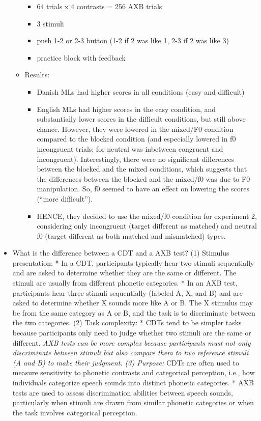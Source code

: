 \documentclass[
]{article}
\providecommand{\tightlist}{%
  \setlength{\itemsep}{0pt}\setlength{\parskip}{0pt}}
\begin{document}
\begin{itemize}
\begin{itemize}
    \begin{itemize}
    \tightlist
    \item
      64 trials x 4 contrasts = 256 AXB trials
    \item
      3 stimuli
    \item
      push 1-2 or 2-3 button (1-2 if 2 was like 1, 2-3 if 2 was like 3)
    \item
      practice block with feedback
    \end{itemize}
  \item
    Results:

    \begin{itemize}
    \tightlist
    \item
      Danish MLs had higher scores in all conditions (easy and
      difficult)
    \item
      English MLs had higher scores in the easy condition, and
      substantially lower scores in the difficult conditions, but still
      above chance. However, they were lowered in the mixed/F0 condition
      compared to the blocked condition (and especially lowered in f0
      incongruent trials; for neutral was inbetween congruent and
      incongruent). Interestingly, there were no significant differences
      between the blocked and the mixed conditions, which suggests that
      the differences between the blocked and the mixed/f0 was due to F0
      manipulation. So, f0 seemed to have an effect on lowering the
      scores (``more difficult'').
    \item
      HENCE, they decided to use the mixed/f0 condition for experiment
      2, considering only incongruent (target different as matched) and
      neutral f0 (target different as both matched and mismatched)
      types.
    \end{itemize}
  \end{itemize}
\item
  What is the difference between a CDT and a AXB test? (1) Stimulus
  presentation: * In a CDT, participants typically hear two stimuli
  sequentially and are asked to determine whether they are the same or
  different. The stimuli are usually from different phonetic categories.
  * In an AXB test, participants hear three stimuli sequentially
  (labeled A, X, and B) and are asked to determine whether X sounds more
  like A or B. The X stimulus may be from the same category as A or B,
  and the task is to discriminate between the two categories. (2) Task
  complexity: * CDTs tend to be simpler tasks because participants only
  need to judge whether two stimuli are the same or different. \emph{AXB
  tests can be more complex because participants must not only
  discriminate between stimuli but also compare them to two reference
  stimuli (A and B) to make their judgment. (3) Purpose: } CDTs are
  often used to measure sensitivity to phonetic contrasts and
  categorical perception, i.e., how individuals categorize speech sounds
  into distinct phonetic categories. * AXB tests are used to assess
  discrimination abilities between speech sounds, particularly when
  stimuli are drawn from similar phonetic categories or when the task
  involves categorical perception.


\end{itemize}
\end{document}

